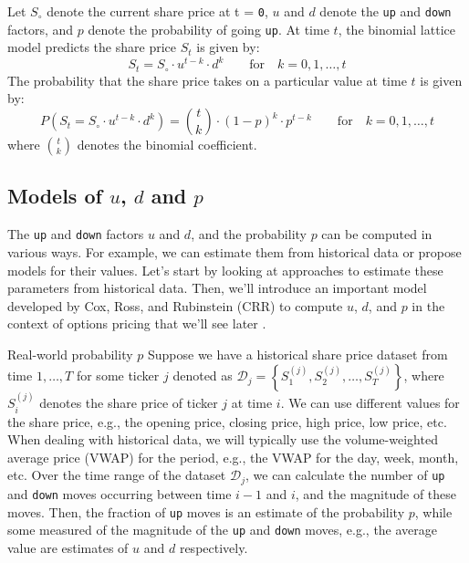 \documentclass[11pt]{article}
\makeatletter
\theoremstyle{definition}
\renewcommand\subsubsection{\@startsection
	{subsubsection}{2}{0mm}
	{-0.05in}
	{-0.5\baselineskip}
	{\normalfont\normalsize\itshape\bfseries}}
\makeatother
\begin{document}
\begin{definition}\label{defn-binomial-distribution}
	Let $S_{\circ}$ denote the current share price at t = \texttt{0}, $u$ and $d$ denote the \texttt{up} and \texttt{down} factors, 
	and $p$ denote the probability of going \texttt{up}.
	At time $t$, the binomial lattice model predicts the share price $S_{t}$ is given by:
	\begin{equation*}
	S_{t} = S_{\circ}\cdot{u}^{t-k}\cdot{d}^{k}\qquad\text{for}\quad{k=0,1,\dots,t}
	\end{equation*}
	The probability that the share price takes on a particular value at time $t$ is given by:
	\begin{equation*}
	P(S_{t} = S_{\circ}\cdot{u}^{t-k}\cdot{d}^{k}) = \binom{t}{k}\cdot{(1-p)}^{k}\cdot{p}^{t-k}\qquad\text{for}\quad{k=0,1,\dots,t}
	\end{equation*}
	where $\binom{t}{k}$ denotes the binomial coefficient.
\end{definition}

\subsection{Models of $u$, $d$ and $p$}
The \texttt{up} and \texttt{down} factors $u$ and $d$, and the probability $p$ can be computed in various ways.  
For example, we can estimate them from historical data or propose models for their values. 
Let's start by looking at approaches to estimate these parameters from historical data. Then, we'll introduce an important model developed by Cox, Ross, and Rubinstein (CRR) to compute $u$, $d$, and $p$ in the 
context of options pricing that we'll see later \citep{COX1979229}.

\subsubsection{Real-world probability $p$}
Suppose we have a historical share price dataset from time $1,\dots, T$ for some ticker $j$ denoted as $\mathcal{D}_{j} = \left\{S^{(j)}_{1}, S^{(j)}_{2},\dots, S^{(j)}_{T}\right\}$, 
where $S^{(j)}_{i}$ denotes the share price of ticker $j$ at time $i$.
We can use different values for the share price, e.g., the opening price, closing price, high price, low price, etc. 
When dealing with historical data, we will typically use the volume-weighted average price (VWAP) for the period, 
e.g., the VWAP for the day, week, month, etc. Over the time range of the dataset $\mathcal{D}_{j}$, we can calculate the number of \texttt{up} and \texttt{down} moves
occurring between time $i-1$ and $i$, and the magnitude of these moves. 
Then, the fraction of \texttt{up} moves is an estimate of the probability $p$, 
while some measured of the magnitude of the \texttt{up} and \texttt{down} moves, e.g., the average value are estimates of $u$ and $d$ respectively.
\end{document}
